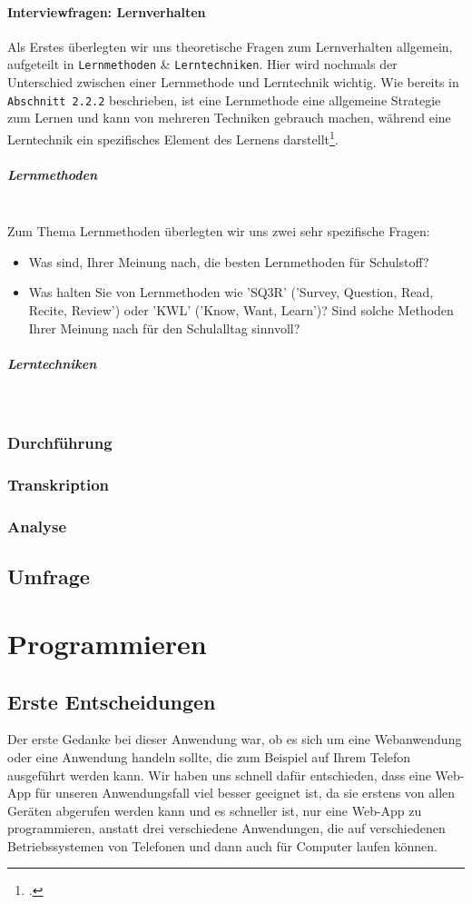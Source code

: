 \documentclass[12pt,a4paper]{report}
\newcommand{\myparagraph}[1]{\paragraph{#1}\mbox{}\\}
\begin{document}
\subsubsection {Interviewfragen: Lernverhalten}
Als Erstes überlegten wir uns theoretische Fragen zum Lernverhalten allgemein, aufgeteilt in \texttt{Lernmethoden} \& \texttt{Lerntechniken}. 
Hier wird nochmals der Unterschied zwischen einer Lernmethode und Lerntechnik wichtig. 
Wie bereits in \texttt{Abschnitt 2.2.2} beschrieben, ist eine Lernmethode eine allgemeine Strategie zum Lernen und kann von mehreren Techniken gebrauch machen, während eine Lerntechnik ein spezifisches Element des Lernens darstellt\footcite{Lerntechnik_1}.


\myparagraph{Lernmethoden}
Zum Thema Lernmethoden überlegten wir uns zwei sehr spezifische Fragen:
\begin{itemize}
    \item Was sind, Ihrer Meinung nach, die besten Lernmethoden für Schulstoff?
    \item Was halten Sie von Lernmethoden wie 'SQ3R' ('Survey, Question, Read, Recite, Review') oder 'KWL' ('Know, Want, Learn')? Sind solche Methoden Ihrer Meinung nach für den Schulalltag sinnvoll?
 \end{itemize}

\myparagraph{Lerntechniken}
\subsection {Durchführung}

\subsection {Transkription}

\subsection {Analyse}

\section{Umfrage}


\chapter{Programmieren}
\section{Erste Entscheidungen}
Der erste Gedanke bei dieser Anwendung war, ob es sich um eine Webanwendung oder eine Anwendung handeln sollte, die zum Beispiel auf Ihrem Telefon ausgeführt werden kann. Wir haben uns schnell dafür entschieden, dass eine Web-App für unseren Anwendungsfall viel besser geeignet ist, da sie erstens von allen Geräten abgerufen werden kann und es schneller ist, nur eine Web-App zu programmieren, anstatt drei verschiedene Anwendungen, die auf verschiedenen Betriebssystemen von Telefonen und dann auch für Computer laufen können.
\end{document}
